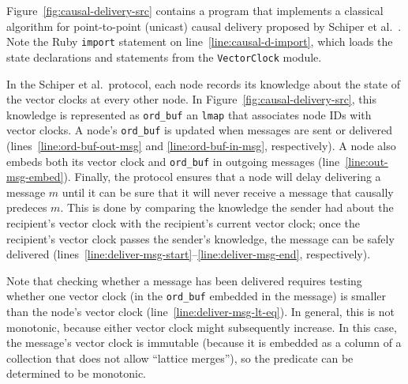 Figure~\ref{fig:causal-delivery-src} contains a \lang program that implements a
classical algorithm for point-to-point (unicast) causal delivery proposed by
Schiper et al.~\cite{Schiper1989}. Note the Ruby \texttt{import} statement on
line~\ref{line:causal-d-import}, which loads the \lang state declarations and
statements from the \texttt{VectorClock} module.

In the Schiper et al.\ protocol, each node records its knowledge about the state
of the vector clocks at every other node. In
Figure~\ref{fig:causal-delivery-src}, this knowledge is represented as
\texttt{ord\_buf} an \texttt{lmap} that associates node IDs with vector
clocks. A node's \texttt{ord\_buf} is updated when messages are sent or
delivered (lines~\ref{line:ord-buf-out-msg} and \ref{line:ord-buf-in-msg},
respectively). A node also embeds both its vector clock and \texttt{ord\_buf} in
outgoing messages (line~\ref{line:out-msg-embed}). Finally, the protocol ensures
that a node will delay delivering a message $m$ until it can be sure that it
will never receive a message that causally predeces $m$. This is done by
comparing the knowledge the sender had about the recipient's vector clock with
the recipient's current vector clock; once the recipient's vector clock passes
the sender's knowledge, the message can be safely delivered
(lines~\ref{line:deliver-msg-start}--\ref{line:deliver-msg-end}, respectively).

Note that checking whether a message has been delivered requires testing whether
one vector clock (in the \texttt{ord\_buf} embedded in the message) is smaller
than the node's vector clock (line~\ref{line:deliver-msg-lt-eq}). In general,
this is not monotonic, because either vector clock might subsequently
increase. In this case, the message's vector clock is immutable (because it is
embedded as a column of a collection that does not allow ``lattice merges''), so
the predicate can be determined to be monotonic.


